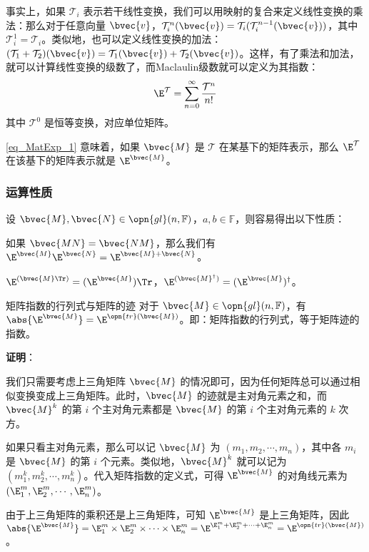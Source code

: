 事实上，如果 $\mathcal{T}_i$ 表示若干线性变换，我们可以用映射的复合来定义线性变换的乘法：那么对于任意向量 $\bvec{v}$，$\mathcal{T}^n_i(\bvec{v})=\mathcal{T}_i(\mathcal{T}^{n-1}_i(\bvec{v}))$，其中 $\mathcal{T}_i^1=\mathcal{T}_i$。类似地，也可以定义线性变换的加法：$(\mathcal{T}_1+\mathcal{T}_2)(\bvec{v})=\mathcal{T}_1(\bvec{v})+\mathcal{T}_2(\bvec{v})$。这样，有了乘法和加法，就可以计算线性变换的级数了，而Maclaulin级数就可以定义为其指数：
\begin{equation}
\E^\mathcal{T}=\sum\limits_{n=0}^\infty \frac{\mathcal{T}^n}{n!}
\end{equation}
其中 $\mathcal{T}^0$ 是恒等变换，对应单位矩阵。

\autoref{eq_MatExp_1} 意味着，如果 $\bvec{M}$ 是 $\mathcal{T}$ 在某基下的矩阵表示，那么 $\E^\mathcal{T}$ 在该基下的矩阵表示就是 $\E^{\bvec{M}}$。

\subsubsection{运算性质}

设 $\bvec{M}, \bvec{N}\in \opn{gl}(n, \mathbb{F})$，$a, b\in\mathbb{F}$，则容易得出以下性质：

如果 $\bvec{MN}=\bvec{NM}$，那么我们有 $\E^{\bvec{M}}\E^{\bvec{N}}=\E^{\bvec{M}+\bvec{N}}$。

$\E^{(\bvec{M}\Tr)}=(\E^{\bvec{M}})\Tr$，$\E^{(\bvec{M}^\dagger)}=({\E^{\bvec{M}}})^\dagger$。

\begin{theorem}{矩阵指数的行列式与矩阵的迹}\label{the_MatExp_2}
对于 $\bvec{M}\in\opn{gl}(n, \mathbb{F})$，有 $\abs{\E^{\bvec{M}}}=\E^{\opn{tr}(\bvec{M})}$。即：矩阵指数的行列式，等于矩阵迹的指数。
\end{theorem}

\textbf{证明}：

我们只需要考虑上三角矩阵 $\bvec{M}$ 的情况即可，因为任何矩阵总可以通过相似变换变成上三角矩阵。此时，$\bvec{M}$ 的迹就是主对角元素之和，而 $\bvec{M}^k$ 的第 $i$ 个主对角元素都是 $\bvec{M}$ 的第 $i$ 个主对角元素的 $k$ 次方。

如果只看主对角元素，那么可以记 $\bvec{M}$ 为 $(m_1, m_2,\cdots,m_n)$，其中各 $m_i$ 是 $\bvec{M}$ 的第 $i$ 个元素。类似地，$\bvec{M}^k$ 就可以记为 $(m_1^k, m_2^k,\cdots,m_n^k)$。代入矩阵指数的定义式，可得 $\E^{\bvec{M}}$ 的对角线元素为 $(\E^m_1, \E^m_2,\cdots, \E^m_n)$。

由于上三角矩阵的乘积还是上三角矩阵，可知 $\E^{\bvec{M}}$ 是上三角矩阵，因此 $\abs{\E^{\bvec{M}}}=\E^m_1\times\E^m_2\times\cdots\times\E^m_n=\E^{\E^m_1+\E^m_2+\cdots+\E^m_n}=\E^{\opn{tr}(\bvec{M})}$。

